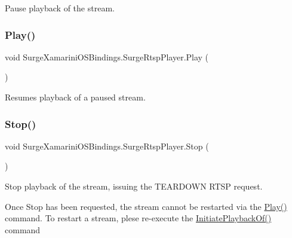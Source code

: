 Pause playback of the stream. 

\mbox{\label{interface_surge_xamarini_o_s_bindings_1_1_surge_rtsp_player_a3f7d8277f7aa65454732afd623ee53af}} 
\subsubsection{\texorpdfstring{Play()}{Play()}}
{\footnotesize\ttfamily void Surge\+Xamarini\+O\+S\+Bindings.\+Surge\+Rtsp\+Player.\+Play (\begin{DoxyParamCaption}{ }\end{DoxyParamCaption})}



Resumes playback of a paused stream. 

\mbox{\label{interface_surge_xamarini_o_s_bindings_1_1_surge_rtsp_player_ac4cb8b34437ee896e4529cddca339bed}} 
\subsubsection{\texorpdfstring{Stop()}{Stop()}}
{\footnotesize\ttfamily void Surge\+Xamarini\+O\+S\+Bindings.\+Surge\+Rtsp\+Player.\+Stop (\begin{DoxyParamCaption}{ }\end{DoxyParamCaption})}



Stop playback of the stream, issuing the T\+E\+A\+R\+D\+O\+WN R\+T\+SP request. 

Once Stop has been requested, the stream cannot be restarted via the \hyperlink{interface_surge_xamarini_o_s_bindings_1_1_surge_rtsp_player_a3f7d8277f7aa65454732afd623ee53af}{Play()} command. To restart a stream, plese re-\/execute the \hyperlink{interface_surge_xamarini_o_s_bindings_1_1_surge_rtsp_player_a7c2572b559c1758415a21c0bde4417be}{Initiate\+Playback\+Of()} command 

